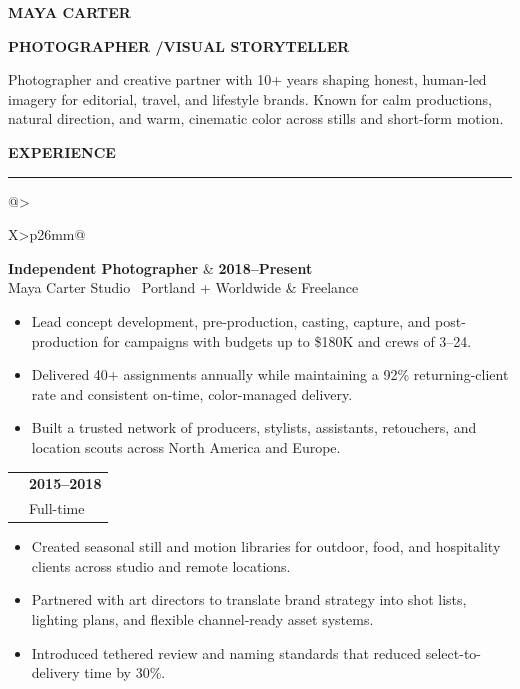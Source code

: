 \documentclass[10pt,a4paper]{article}
\makeatletter
\newcommand{\mainheading}[1]{%
  \vspace{3.3mm}%
  {\fontsize{9}{11}\selectfont\bfseries\color{terracotta}\MakeUppercase{#1}}\par
  \vspace{1mm}%
  {\color{rulecolor}\rule{\linewidth}{0.45pt}}\par
  \vspace{2.2mm}%
}
\newcommand{\role}[4]{%
  \begin{tabularx}{\linewidth}{@{}>{\raggedright\arraybackslash}X>{\raggedleft\arraybackslash}p{26mm}@{}}
    {\fontsize{10.4}{12}\selectfont\bfseries\color{ink}#1} &
    {\fontsize{8.5}{10}\selectfont\bfseries\color{terracotta}#2} \\
    {\fontsize{8.8}{10.7}\selectfont\color{muted}#3} &
    {\fontsize{8.3}{10}\selectfont\color{muted}#4}
  \end{tabularx}%
  \vspace{-0.8mm}%
}
\makeatother
\begin{document}
\begin{minipage}[t]{122mm}
  \vspace{0pt}%
  \raggedright

  {\fontsize{28}{30}\selectfont\bfseries\color{ink}MAYA CARTER}\par
  \vspace{1.8mm}
  {\fontsize{10.5}{13}\selectfont\bfseries\color{terracotta}\MakeUppercase{Photographer \enspace/\enspace Visual Storyteller}}\par
  \vspace{4mm}
  {\fontsize{9.25}{13.2}\selectfont\color{muted}
    Photographer and creative partner with 10+ years shaping honest, human-led imagery
    for editorial, travel, and lifestyle brands. Known for calm productions, natural
    direction, and warm, cinematic color across stills and short-form motion.
  }\par

  \mainheading{Experience}

  \role{Independent Photographer}{2018--Present}{Maya Carter Studio \textbullet\ Portland + Worldwide}{Freelance}
  \begin{itemize}
    \item Lead concept development, pre-production, casting, capture, and post-production for campaigns with budgets up to \$180K and crews of 3--24.
    \item Delivered 40+ assignments annually while maintaining a 92\% returning-client rate and consistent on-time, color-managed delivery.
    \item Built a trusted network of producers, stylists, assistants, retouchers, and location scouts across North America and Europe.
  \end{itemize}
  \vspace{1mm}

  \role{Senior Photographer}{2015--2018}{Fieldwork Creative \textbullet\ Portland, OR}{Full-time}
  \begin{itemize}
    \item Created seasonal still and motion libraries for outdoor, food, and hospitality clients across studio and remote locations.
    \item Partnered with art directors to translate brand strategy into shot lists, lighting plans, and flexible channel-ready asset systems.
    \item Introduced tethered review and naming standards that reduced select-to-delivery time by 30\%.
  \end{itemize}
  \vspace{1mm}


\end{minipage}
\end{document}
